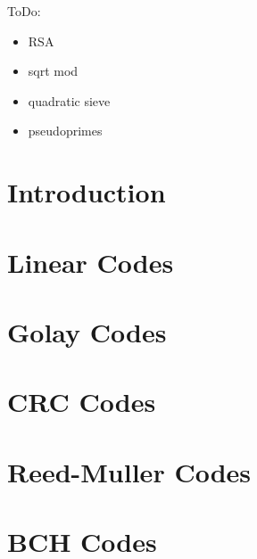 \bigskip

ToDo:

\begin{itemize}
\item
RSA
\item
sqrt mod
\item
quadratic sieve
\item
pseudoprimes
\end{itemize}

\bigskip

\label{sec:coding}



\section{Introduction}



\clearpage

\section{Linear Codes}
\label{sec:linear:codes}






\clearpage

\section{Golay Codes}
\label{sec:Golay}






\clearpage

\section{CRC Codes}
\label{sec:CRC}






\clearpage

\section{Reed-Muller Codes}
\label{sec:Reed:Muller}






\clearpage

\section{BCH Codes}
\label{sec:BCH}



